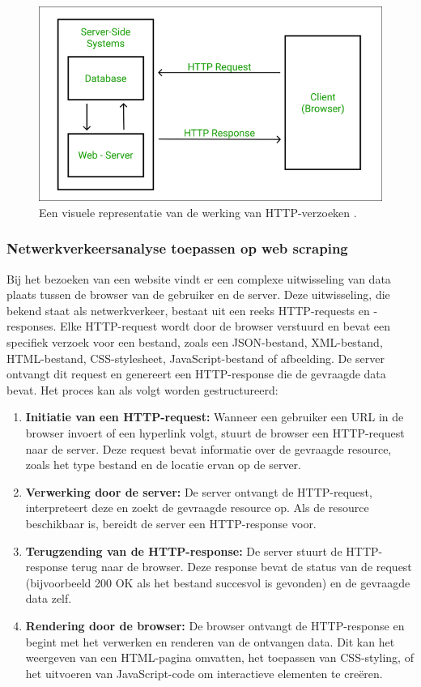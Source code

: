 \begin{figure}[h]
    \centering
    \includegraphics[width=\linewidth]{graphics/http.png}
    \caption{Een visuele representatie van de werking van HTTP-verzoeken \autocite{Samuel2022}.}
    \label{fig:HTTP}
\end{figure}
\subsubsection{Netwerkverkeersanalyse toepassen op web scraping}
Bij het bezoeken van een website vindt er een complexe uitwisseling van data plaats tussen de browser van de gebruiker en de server. Deze uitwisseling, die bekend staat als netwerkverkeer, bestaat uit een reeks HTTP-requests en -responses.
Elke HTTP-request wordt door de browser verstuurd en bevat een specifiek verzoek voor een bestand, zoals een JSON-bestand, XML-bestand, HTML-bestand, CSS-stylesheet, JavaScript-bestand of afbeelding. De server ontvangt dit request en genereert een HTTP-response die de gevraagde data bevat. Het proces kan als volgt worden gestructureerd:
\begin{enumerate}
    \item \textbf{Initiatie van een HTTP-request:} Wanneer een gebruiker een URL in de browser invoert of een hyperlink volgt, stuurt de browser een HTTP-request naar de server. Deze request bevat informatie over de gevraagde resource, zoals het type bestand en de locatie ervan op de server.

    \item \textbf{Verwerking door de server:} De server ontvangt de HTTP-request, interpreteert deze en zoekt de gevraagde resource op. Als de resource beschikbaar is, bereidt de server een HTTP-response voor.

    \item \textbf{Terugzending van de HTTP-response:} De server stuurt de HTTP-response terug naar de browser. Deze response bevat de status van de request (bijvoorbeeld 200 OK als het bestand succesvol is gevonden) en de gevraagde data zelf.

    \item \textbf{Rendering door de browser:} De browser ontvangt de HTTP-response en begint met het verwerken en renderen van de ontvangen data. Dit kan het weergeven van een HTML-pagina omvatten, het toepassen van CSS-styling, of het uitvoeren van JavaScript-code om interactieve elementen te creëren.
\end{enumerate}

